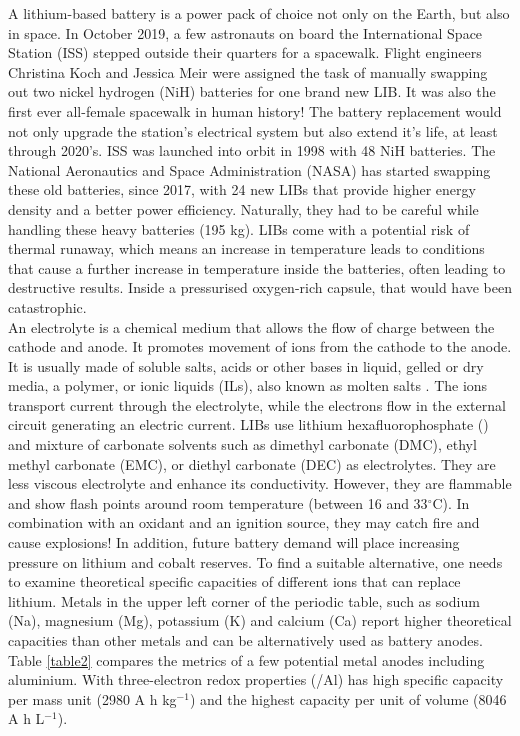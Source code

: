A lithium-based battery is a power pack of choice not only on the Earth, but also in space. In October 2019, a few astronauts on board the International Space Station (ISS) stepped outside their quarters for a spacewalk. Flight engineers Christina Koch and Jessica Meir were assigned the task of manually swapping out two nickel hydrogen (NiH) batteries for one brand new LIB. It was also the first ever all-female spacewalk in human history! The battery replacement would not only upgrade the station's electrical system but also extend it's life, at least through 2020's. ISS was launched into orbit in 1998 with 48 NiH batteries. The National Aeronautics and Space Administration (NASA) has started swapping these old batteries, since 2017, with 24 new LIBs  that provide higher energy density and a better power efficiency. Naturally, they had to be careful while handling these heavy batteries (195 kg). LIBs come with a potential risk of thermal runaway, which means an increase in temperature leads to conditions that cause a further increase in temperature inside the batteries, often leading to destructive results. Inside a pressurised oxygen-rich capsule, that would have been catastrophic.\\
An electrolyte is a chemical medium that allows the flow of charge between the cathode and anode. It promotes movement of ions from the cathode to the anode. It is usually made of soluble salts, acids or other bases in liquid, gelled or dry media, a polymer, or ionic liquids (ILs), also known as molten salts \cite{xu_nonaqueous_2004,armand_ionic-liquid_2009,croce_nanocomposite_1998}. The ions transport current through the electrolyte, while the electrons flow in the external circuit generating an electric current. LIBs use lithium hexafluorophosphate () and mixture of carbonate solvents such as dimethyl carbonate (DMC), ethyl methyl carbonate (EMC), or diethyl carbonate (DEC) as electrolytes. They are less viscous electrolyte and enhance its conductivity. However, they are flammable and show flash points around room temperature (between 16 and 33$^{\circ}$C). In combination with an oxidant and an ignition source, they may catch fire and cause explosions! In addition, future battery demand will place increasing pressure on lithium and cobalt reserves\cite{turcheniuk_ten_2018}. To find a suitable alternative, one needs to examine theoretical specific capacities of different ions that can replace lithium. Metals in the upper left corner of the periodic table, such as sodium (Na), magnesium (Mg), potassium (K) and calcium (Ca) report higher theoretical capacities than other metals and can be alternatively used as battery anodes. Table  \ref{table2} compares the metrics of a few potential metal anodes including aluminium. With three-electron redox properties (/Al) has high specific capacity per mass unit (2980 A h kg$^{-1}$) and the highest capacity per unit of volume (8046 A h L$^{-1}$)\cite{ambroz_trends_2017}.

